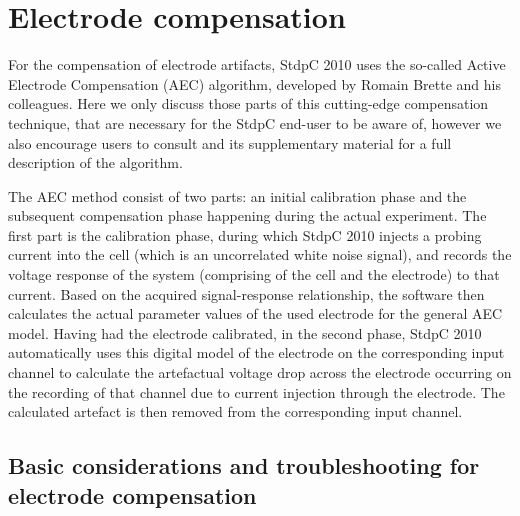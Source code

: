 \documentclass{article}
\begin{document}
\section{Electrode compensation} \label{eleccomp}

For the compensation of electrode artifacts, StdpC 2010 uses the so-called Active
Electrode Compensation (AEC) algorithm, developed by Romain Brette and his 
colleagues. Here we only discuss those parts of this cutting-edge
compensation technique, that are necessary for the StdpC end-user to be aware of,
however we also encourage users to consult \cite{Brette2008} 
and its supplementary material for a full description of the algorithm.

The AEC method consist of two parts: an initial calibration phase and
the subsequent compensation phase happening during the actual
experiment. The first part is the calibration phase, during which
StdpC 2010 injects a probing current into the cell (which is an
uncorrelated white noise signal), and records the voltage response of
the system (comprising of the cell and the electrode) to that
current. Based on the acquired signal-response relationship, the
software then calculates the actual parameter values of the used
electrode for the general AEC model. Having had the electrode
calibrated, in the second phase, StdpC 2010 automatically uses this
digital model of the electrode on the corresponding input channel to
calculate the artefactual voltage drop across the electrode
occurring on the recording of that channel due to current injection
through the electrode. The calculated artefact is then removed from the
corresponding input channel.

\subsection{Basic considerations and troubleshooting for electrode compensation}
\end{document}
